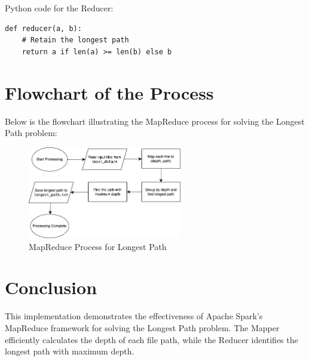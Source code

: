\documentclass[12pt]{article}
\begin{document}
\noindent Python code for the Reducer:
\begin{verbatim}
def reducer(a, b):
    # Retain the longest path
    return a if len(a) >= len(b) else b
\end{verbatim}

\section{Flowchart of the Process}
Below is the flowchart illustrating the MapReduce process for solving the Longest Path problem:


\begin{figure}[h]
\centering
\includegraphics[width=0.6\textwidth]{mapper_reducer_workflow.png}
\caption{MapReduce Process for Longest Path}
\end{figure}

\section{Conclusion}
This implementation demonstrates the effectiveness of Apache Spark's MapReduce framework for solving the Longest Path problem. The Mapper efficiently calculates the depth of each file path, while the Reducer identifies the longest path with maximum depth.
\end{document}
